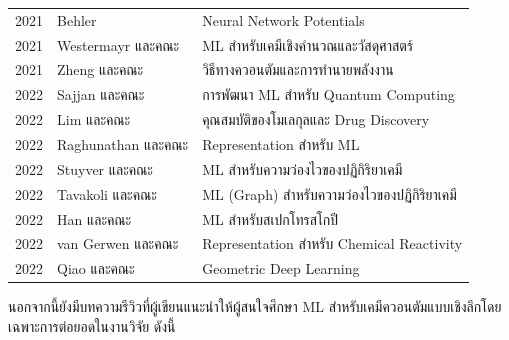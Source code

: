 \begin{table}[H]
\begin{tabular}{cll}
    2021 &Behler\autocite{behler2021} &Neural Network Potentials \\
    2021 &Westermayr และคณะ\autocite{westermayr2021b} &ML สำหรับเคมีเชิงคำนวณและวัสดุศาสตร์ \\
    2021 &Zheng และคณะ\autocite{zheng2021} &วิธีทางควอนตัมและการทำนายพลังงาน \\
    2022 &Sajjan และคณะ\autocite{sajjan2022} &การพัฒนา ML สำหรับ Quantum Computing \\
    2022 &Lim และคณะ\autocite{lim2022} &คุณสมบัติของโมเลกุลและ Drug Discovery \\
    2022 &Raghunathan และคณะ\autocite{raghunathan2022} &Representation สำหรับ ML \\
    2022 &Stuyver และคณะ\autocite{stuyver2022} &ML สำหรับความว่องไวของปฏิกิริยาเคมี \\
    2022 &Tavakoli และคณะ\autocite{tavakoli2022} &ML (Graph) สำหรับความว่องไวของปฏิกิริยาเคมี \\
    2022 &Han และคณะ\autocite{han2022} &ML สำหรับสเปกโทรสโกปี \\
    2022 &van Gerwen และคณะ\autocite{gerwen2022} &Representation สำหรับ Chemical Reactivity \\
    2022 &Qiao และคณะ\autocite{qiao2022} &Geometric Deep Learning \\
    \bottomrule
    \end{tabular}
\end{table}

นอกจากนี้ยังมีบทความรีวิวที่ผู้เขียนแนะนำให้ผู้สนใจศึกษา ML สำหรับเคมีควอนตัมแบบเชิงลึกโดยเฉพาะการต่อยอดในงานวิจัย ดังนี้

